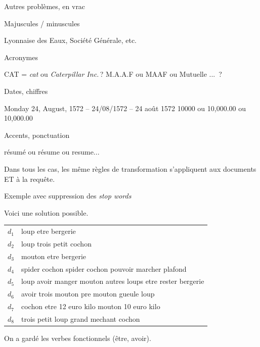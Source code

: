 \begin{frame}{Autres problèmes, en vrac}


\alert{Majuscules / minuscules}

Lyonnaise des Eaux, Société Générale, etc.

\vfill
 \alert{Acronymes}
 
   CAT = \textit{cat} ou \textit{Caterpillar Inc.}\,?  M.A.A.F ou MAAF ou Mutuelle ... \,?

\vfill

\alert{Dates, chiffres}

   Monday 24, August, 1572 -- 24/08/1572 -- 24 août 1572
    10000 ou 10,000.00 ou 10,000.00
     
     
     \vfill
     
     \alert{Accents, ponctuation}
     
     résumé ou résume ou resume... 
     
 \begin{remark}
 Dans tous les cas, les même règles de transformation s'appliquent aux documents ET à la requête.
 \end{remark}
 \end{frame}


\begin{frame}{Exemple avec suppression des \textit{stop words}}

Voici une solution possible.

\vfill

\begin{tabular}{>{\color{structure.fg}}ll}
     $d_1$&loup etre bergerie\\
     $d_2$&loup  trois petit cochon\\
     $d_3$&mouton etre bergerie\\
     $d_4$&spider cochon spider cochon pouvoir marcher plafond\\
     $d_5$&loup avoir manger mouton  autres loups etre rester bergerie\\
     $d_6$&avoir trois mouton pre mouton gueule loup\\
     $d_7$&cochon etre 12 euro kilo mouton 10 euro kilo\\
     $d_8$&trois petit loup grand mechant cochon\\
\end{tabular}

\vfill

On a gardé les verbes fonctionnels (être, avoir).
\end{frame}

